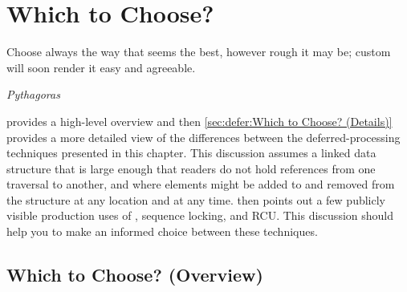 
\section{Which to Choose?}
\label{sec:defer:Which to Choose?}
%
\epigraph{Choose always the way that seems the best, however rough it
	  may be; custom will soon render it easy and agreeable.}
	  {\emph{Pythagoras}}

provides a high-level overview and then
\cref{sec:defer:Which to Choose? (Details)}
provides a more detailed view
of the differences between the deferred-processing techniques presented
in this chapter.
This discussion assumes a linked data structure that is large enough
that readers do not hold references from one traversal to another,
and where elements might be added to and removed from the structure
at any location and at any time.
then points out a few publicly visible production uses of
, sequence locking, and RCU\@.
This discussion should help you to make an informed choice between
these techniques.

\subsection{Which to Choose? (Overview)}
\label{sec:defer:Which to Choose? (Overview)}

\begin{table*}
\renewcommand*{\arraystretch}{1.25}
\footnotesize
\centering\OneColumnHSpace{-.3in}
\caption{Which Deferred Technique to Choose? (Overview)}
\label{tab:defer:Which Deferred Technique to Choose? (Overview)}
\end{table*}

